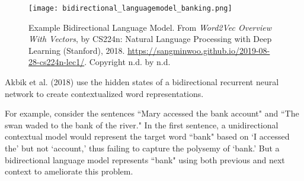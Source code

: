 \begin{figure}[h]
\vspace{-5pt}
\centering
\texttt{[image: bidirectional\_languagemodel\_banking.png]}
\vspace{-5pt}
\caption{\footnotesize Example Bidirectional Language Model. From \emph{Word2Vec Overview With Vectors}, by CS224n: Natural Language Processing with Deep Learning (Stanford), 2018. \url{https://sangminwoo.github.io/2019-08-28-cs224n-lec1/}. Copyright n.d. by n.d.}
\vspace{-5pt}
\end{figure}

Akbik et al. (2018) use the hidden states of a bidirectional recurrent neural network to create contextualized word representations. 

For example, consider the sentences ``Mary accessed the bank account" and ``The swan waded to the bank of the river." In the first sentence, a unidirectional contextual model would represent the target word ``bank" based on `I accessed the' but not `account,' thus failing to capture the polysemy of `bank.' But a bidirectional language model represents ``bank" using both previous and next context to ameliorate this problem.
